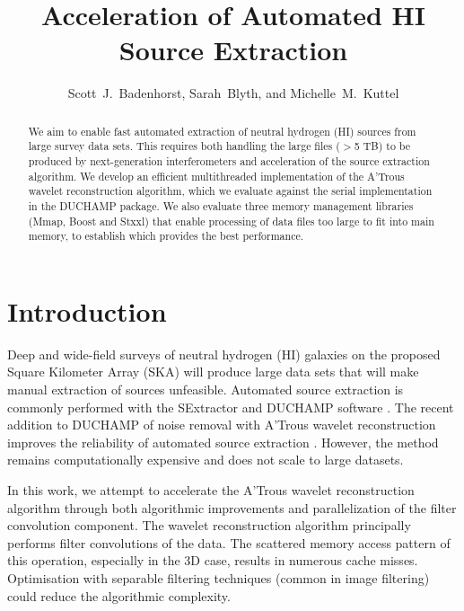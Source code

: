 
\resetcounters





\title{Acceleration of Automated HI Source Extraction} 

\author{Scott~J.~Badenhorst, Sarah~Blyth, and Michelle~M.~Kuttel
}


\begin{abstract}
We aim to enable fast automated extraction of neutral hydrogen (HI)  sources from large survey data sets. 
This requires both handling the large files ($>$5 TB) to be produced by next-generation interferometers and acceleration of  the source extraction algorithm.  We develop an efficient multithreaded implementation of the A'Trous wavelet reconstruction algorithm, which we evaluate against the serial implementation in the DUCHAMP package.  We also evaluate three memory management libraries (Mmap, Boost and Stxxl) that enable processing of data files too large to fit into main memory, to establish which provides the best performance. 
\end{abstract}

\section{Introduction}

Deep and wide-field surveys of neutral hydrogen (HI) galaxies on the proposed Square Kilometer Array (SKA) will produce large data sets that will make manual extraction of sources unfeasible.  Automated source extraction is commonly performed with the SExtractor \citep{Bertin1996} and DUCHAMP software \citep{Whiting2012}.   The recent addition to DUCHAMP of  noise removal with A'Trous wavelet reconstruction \citep{West2010} improves the reliability of automated source extraction \citep{Popping2012, Whiting2012}. However, the method remains computationally expensive and does not scale to large datasets.  

In this work, we attempt to accelerate the A'Trous wavelet reconstruction algorithm through both algorithmic improvements and parallelization of the filter convolution component. The wavelet reconstruction algorithm  principally performs filter convolutions of the data. The scattered memory access pattern of this operation, especially in the 3D case, results in numerous cache misses.  Optimisation with separable filtering techniques (common in image filtering) could reduce the algorithmic complexity. 

